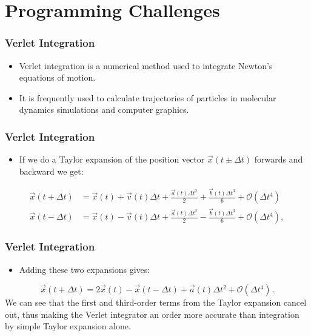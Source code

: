 
\section[Programming Challenges]{Programming Challenges}

\begin{frame}
\frametitle{Verlet Integration}
\begin{itemize}
\item Verlet integration is a numerical method used to integrate Newton's equations of motion.
\item It is frequently used to calculate trajectories of particles in molecular dynamics simulations and computer graphics.
\end{itemize}
\end{frame}

\begin{frame}
\frametitle{Verlet Integration}
\begin{itemize}
\item If we do a Taylor expansion of the position vector $\vec{x}(t\pm\Delta t)$ forwards and backward we get:
\end{itemize}
\begin{align*}
\vec{x}(t + \Delta t)
&= \vec{x}(t) + \vec{v}(t)\Delta t + \frac{\vec{a}(t) \Delta t^2}{2}
+ \frac{\vec{b}(t) \Delta t^3}{6} + \mathcal{O}(\Delta t^4)\\
\vec{x}(t - \Delta t)
&= \vec{x}(t) - \vec{v}(t)\Delta t + \frac{\vec{a}(t) \Delta t^2}{2}
- \frac{\vec{b}(t) \Delta t^3}{6} + \mathcal{O}(\Delta t^4), \,
\end{align*}
\end{frame}

\begin{frame}
\frametitle{Verlet Integration}
\begin{itemize}
\item Adding these two expansions gives:
\end{itemize}
\[\vec{x}(t + \Delta t) = 2\vec{x}(t) - \vec{x}(t - \Delta t) + \vec{a}(t) \Delta t^2 + \mathcal{O}(\Delta t^4)\, .\]
\vspace{2mm}
We can see that the first and third-order terms from the Taylor expansion cancel out, thus making the Verlet integrator an order more accurate than integration by simple Taylor expansion alone.
\end{frame}

